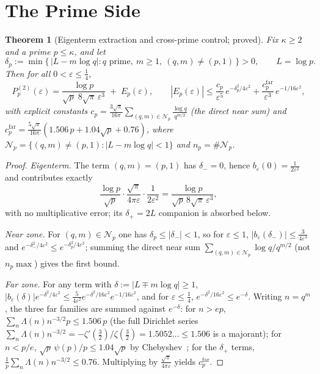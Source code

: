 \documentclass[11pt]{article}
\newtheorem{theorem}{Theorem}[section]
\newcommand{\Pp}{P_p^{(2)}}                 %
\begin{document}
\section{The Prime Side}
\label{sec:prime}

\begin{theorem}[Eigenterm extraction and cross-prime control; proved]
\label{thm:prime}
Fix $\kappa\ge 2$ and a prime $p\le\kappa$, and let
\[
\delta_p := \min\bigl\{\,|L-m\log q| : q\text{ prime},\ m\ge 1,\
   (q,m)\ne(p,1)\,\bigr\}>0,
\qquad L=\log p.
\]
Then for all $0<\varepsilon\le\tfrac14$,
\[
\Pp(\varepsilon)
 = \frac{\log p}{\sqrt p\;8\sqrt\pi\,\varepsilon^3} \;+\; E_p(\varepsilon),
\qquad
|E_p(\varepsilon)|
 \le \frac{c_p}{\varepsilon^5}\,e^{-\delta_p^2/4\varepsilon^2}
   + \frac{c_p^{\mathrm{far}}}{\varepsilon^3}\,e^{-1/16\varepsilon^2},
\]
with explicit constants
$c_p=\tfrac{3\sqrt\pi}{16\pi}
\sum_{(q,m)\in\mathcal N_p}\tfrac{\log q}{q^{m/2}}$ (the direct near sum) and
$c_p^{\mathrm{far}}=\tfrac{5\sqrt\pi}{16\pi}
(1.506\,p+1.04\sqrt p+0.76)$, where
$\mathcal N_p=\{(q,m)\ne(p,1):|L-m\log q|<1\}$ and $n_p=\#\mathcal N_p$.
\end{theorem}

\begin{proof}
\emph{Eigenterm.}
The term $(q,m)=(p,1)$ has $\delta_-=0$, hence
$b_\varepsilon(0)=\tfrac{1}{2\varepsilon^2}$ and contributes exactly
\[
\frac{\log p}{\sqrt p}\cdot\frac{\sqrt\pi}{4\pi\varepsilon}
\cdot\frac{1}{2\varepsilon^2}
=\frac{\log p}{\sqrt p\,8\sqrt\pi\,\varepsilon^3},
\]
with no multiplicative error; its $\delta_+=2L$ companion is absorbed below.

\emph{Near zone.}
For $(q,m)\in\mathcal N_p$ one has $\delta_p\le|\delta_-|<1$, so for
$\varepsilon\le 1$, $|b_\varepsilon(\delta_-)|\le\tfrac{3}{4\varepsilon^4}$
and $e^{-\delta_-^2/4\varepsilon^2}\le e^{-\delta_p^2/4\varepsilon^2}$;
summing the direct near sum $\sum_{(q,m)\in\mathcal N_p}\log q/q^{m/2}$
(not $n_p\max$) gives the first bound.

\emph{Far zone.}
For any term with $\delta:=|L\mp m\log q|\ge 1$,
$|b_\varepsilon(\delta)|e^{-\delta^2/4\varepsilon^2}
\le\tfrac{5}{4\varepsilon^2}e^{-\delta^2/16\varepsilon^2}e^{-1/16\varepsilon^2}$,
and for $\varepsilon\le\tfrac14$, $e^{-\delta^2/16\varepsilon^2}\le
e^{-\delta}$.
Writing $n=q^m$, the three far families are summed against $e^{-\delta}$:
for $n>ep$, $\sum_n\Lambda(n)n^{-3/2}p\le 1.506\,p$ (the full Dirichlet
series $\sum_n\Lambda(n)n^{-3/2}=-\zeta'(\tfrac32)/\zeta(\tfrac32)=1.5052\ldots\le 1.506$
is a majorant); for $n<p/e$,
$\sqrt p\,\psi(p)/p\le 1.04\sqrt p$ by Chebyshev~\cite{RosserSchoenfeld62};
for the $\delta_+$ terms, $\tfrac1p\sum_n\Lambda(n)n^{-3/2}\le 0.76$.
Multiplying by $\tfrac{\sqrt\pi}{4\pi\varepsilon}$ yields
$c_p^{\mathrm{far}}$.
\end{proof}
\end{document}
